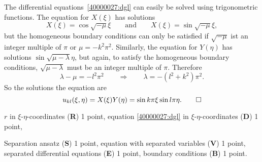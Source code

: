 \begin{diskussion}
The differential equations~\eqref{40000027:dgl} can easily be solved using
trigonometric functions.
The equation for $X(\xi)$ has solutions
\[
X(\xi) = \cos \sqrt{-\mu}\xi
\qquad\text{and}\qquad
X(\xi) = \sin \sqrt{-\mu}\xi,
\]
but the homogeneous boundary conditions can only be satisfied if $\sqrt{-\mu}$
ist an integer multiple of $\pi$ or $\mu=-k^2\pi^2$.
Similarly, the equation for $Y(\eta)$ has solutions
$\sin \sqrt{\mu-\lambda}\eta$, but again, to satisfy the homogeneous
boundary conditions, $\sqrt{\mu-\lambda}$ must be an integer multiple of
$\pi$.
Therefore
\[
\lambda - \mu = -l^2\pi^2
\qquad\Rightarrow\qquad
\lambda = -(l^2 + k^2)\pi^2.
\]
So the solutions the equation are
\[
u_{kl}(\xi,\eta)
=
X(\xi)Y(\eta)
=
\sin k\pi\xi \sin l\pi\eta.
\qedhere
\]
\end{diskussion}

\begin{bewertung}
\begin{teilaufgaben}
\item
$r$ in $\xi$-$\eta$-coordinates ({\bf R}) 1 point,
equation \eqref{40000027:dgl} in $\xi$-$\eta$-coordinates ({\bf D}) 1 point,
\item
Separation ansatz ({\bf S}) 1 point,
equation with separated variables ({\bf V}) 1 point,
separated differential equations ({\bf E}) 1 point,
boundary conditions ({\bf B}) 1 point.
\end{teilaufgaben}
\end{bewertung}
